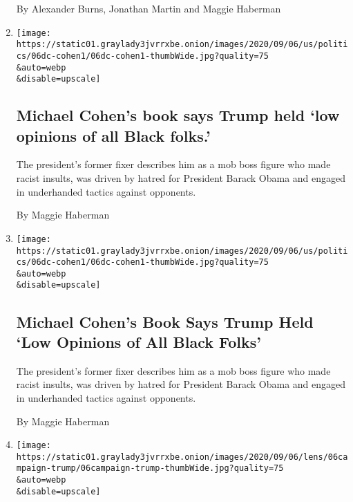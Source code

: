 \begin{enumerate}
  By Alexander Burns, Jonathan Martin and Maggie Haberman
\item
  \href{/live/2020/09/07/us/trump-vs-biden/michael-cohens-book-says-trump-held-low-opinions-of-all-black-folks}{}

  \texttt{[image: https://static01.graylady3jvrrxbe.onion/images/2020/09/06/us/politics/06dc-cohen1/06dc-cohen1-thumbWide.jpg?quality=75\\\&auto=webp\\\&disable=upscale]}

  \hypertarget{michael-cohens-book-says-trump-held-low-opinions-of-all-black-folks}{%
  \subsection{Michael Cohen's book says Trump held `low opinions of all
  Black
  folks.'}\label{michael-cohens-book-says-trump-held-low-opinions-of-all-black-folks}}

  The president's former fixer describes him as a mob boss figure who
  made racist insults, was driven by hatred for President Barack Obama
  and engaged in underhanded tactics against opponents.

  By Maggie Haberman
\item
  \href{/2020/09/06/us/politics/cohen-book-trump.html}{}

  \texttt{[image: https://static01.graylady3jvrrxbe.onion/images/2020/09/06/us/politics/06dc-cohen1/06dc-cohen1-thumbWide.jpg?quality=75\\\&auto=webp\\\&disable=upscale]}

  \hypertarget{michael-cohens-book-says-trump-held-low-opinions-of-all-black-folks-1}{%
  \subsection{Michael Cohen's Book Says Trump Held `Low Opinions of All
  Black
  Folks'}\label{michael-cohens-book-says-trump-held-low-opinions-of-all-black-folks-1}}

  The president's former fixer describes him as a mob boss figure who
  made racist insults, was driven by hatred for President Barack Obama
  and engaged in underhanded tactics against opponents.

  By Maggie Haberman
\item
  \href{/2020/09/06/us/politics/trump-biden-2020.html}{}

  \texttt{[image: https://static01.graylady3jvrrxbe.onion/images/2020/09/06/lens/06campaign-trump/06campaign-trump-thumbWide.jpg?quality=75\\\&auto=webp\\\&disable=upscale]}


\end{enumerate}
